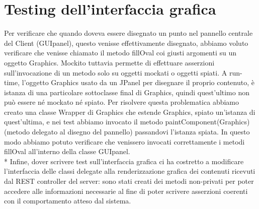 \section{Testing dell'interfaccia grafica}
Per verificare che quando doveva essere disegnato un punto nel pannello centrale del Client (GUIpanel), questo venisse effettivamente disegnato, abbiamo voluto verificare che venisse chiamato il metodo fillOval coi giusti argomenti su un oggetto Graphics. Mockito tuttavia permette di effettuare asserzioni sull'invocazione di un metodo solo su oggetti mockati o oggetti spiati. A run-time, l'oggetto Graphics usato da un JPanel per disegnare il proprio contenuto, \`e istanza di una particolare sottoclasse final di Graphics, quindi quest'ultimo non pu\`o essere n\'e mockato n\'e spiato. Per risolvere questa problematica abbiamo creato una classe Wrapper di Graphics che estende Graphics, spiato un'istanza di quest'ultima, e nei test abbiamo invocato il metodo paintComponent(Graphics) (metodo delegato al disegno del pannello) passandovi l'istanza spiata. In questo modo abbiamo potuto verificare che venissero invocati correttamente i metodi fillOval all'interno della classe GUIpanel.\\*
Infine, dover scrivere test sull'interfaccia grafica ci ha costretto a modificare l'interfaccia delle classi delegate alla renderizzazione grafica dei contenuti ricevuti dal REST controller del server: sono stati creati dei metodi non-privati per poter accedere alle informazioni necessarie al fine di poter scrivere asserzioni coerenti con il comportamento atteso dal sistema.
